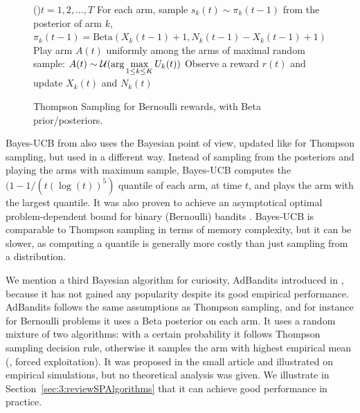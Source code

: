 \begin{figure}[h!]
	\centering
    \begin{framed}
	\begin{algorithm}[H]
		\For(){$t = 1, 2, \dots, T$}{
            For each arm, sample $s_k(t) \sim \pi_k(t-1)$ from the posterior of arm $k$, $\pi_k(t-1)=\mathrm{Beta}(X_k(t-1)+1,N_k(t-1)-X_k(t-1)+1)$\;
            Play arm $A(t)$ uniformly among the arms of maximal random sample: $A(t) \sim \mathcal{U}(\arg\max\limits_{1\leq k \leq K} U_k(t))$\;
            Observe a reward $r(t)$ and update $X_k(t)$ and $N_k(t)$\;
		}
		\caption{Thompson Sampling for Bernoulli rewards, with Beta prior/posteriors.}
		\label{algo:2:ThompsonSampling}
	\end{algorithm}
	\end{framed}
\end{figure}


Bayes-UCB from \cite{Kaufmann12BUCB} also uses the Bayesian point of view, updated like for Thompson sampling, but used in a different way.
Instead of sampling from the posteriors and playing the arms with maximum sample, Bayes-UCB computes the $(1-1/(t (\log(t))^5)$ quantile of each arm, at time $t$, and plays the arm with the largest quantile.
It was also proven to achieve an asymptotical optimal problem-dependent bound for binary (Bernoulli) bandits \cite{Kaufmann12BUCB}.
%
Bayes-UCB is comparable to Thompson sampling in terms of memory complexity, but it can be slower, as computing a quantile is generally more costly than just sampling from a distribution.

We mention a third Bayesian algorithm for curiosity, AdBandits introduced in \cite{Truzzi13}, because it has not gained any popularity despite its good empirical performance.
AdBandits follows the same assumptions as Thompson sampling, and for instance for Bernoulli problems it uses a Beta posterior on each arm.
It uses a random mixture of two algorithms: with a certain probability it follows Thompson sampling decision rule, otherwise it samples the arm with highest empirical mean (\ie, forced exploitation).
It was proposed in the small article \cite{Truzzi13} and illustrated on empirical simulations, but no theoretical analysis was given.
We illustrate in Section~\ref{sec:3:reviewSPAlgorithms} that it can achieve good performance in practice.

